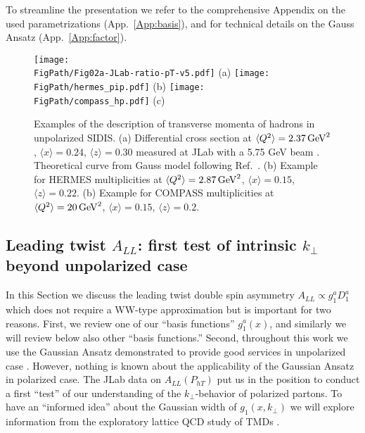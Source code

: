 \documentclass[a4paper,11pt]{article}
\newcommand{\la}{\langle}
\newcommand{\ra}{\rangle}
\def\Phperp{P_{hT}}
\def\kperp{k_\perp}
\newcommand*{\FigPath}{./figs}%
\begin{document}
To streamline the presentation we refer to the comprehensive Appendix 
on the used parametrizations (App.~\ref{App:basis}), and for 
technical details on the Gauss Ansatz (App.~\ref{App:factor}).

\begin{figure}[t!]
\centering
\texttt{[image: \\FigPath/Fig02a-JLab-ratio-pT-v5.pdf]}  (a)
\texttt{[image: \\FigPath/hermes\_pip.pdf]} (b)
\texttt{[image: \\FigPath/compass\_hp.pdf]} (c)
\caption{\label{FUU-show-pT-dependence}
Examples of the description of transverse momenta of hadrons in 
unpolarized SIDIS. 
(a) Differential cross section at $\la Q^2\ra=2.37\,{\rm GeV}^2$,
$\la x\ra  =0.24$, $\la z\ra  =0.30$ measured at JLab with a 5.75 GeV 
beam \cite{Osipenko:2008aa}. Theoretical curve from Gauss model 
following Ref.~\cite{Schweitzer:2010tt}.
(b) Example for HERMES multiplicities \cite{Airapetian:2012ki} at $\la Q^2\ra=2.87\,{\rm GeV}^2$,
$\la x\ra  =0.15$, $\la z\ra  =0.22$.
(b) Example for COMPASS multiplicities \cite{Aghasyan:2017ctw} at $\la Q^2\ra=20\,{\rm GeV}^2$,
$\la x\ra  =0.15$, $\la z\ra  =0.2$.}
\end{figure}



\subsection{\boldmath Leading twist $A_{LL}$: 
           first test of intrinsic $\kperp$ beyond unpolarized case}
\label{Sec-5.2:FLL-basis}

In this Section we discuss the leading twist double spin asymmetry 
$A_{LL} \propto g_{1}^a D_1^a$ which does not require a WW-type approximation
but is important for two reasons. First, we review one of our 
``basis functions'' $g_1^a(x)$, and similarly we will review below 
also other ``basis functions.'' Second, throughout this work we use the 
Gaussian Ansatz demonstrated to provide good services in unpolarized case 
\cite{Anselmino:2005nn,Collins:2005ie,D'Alesio:2007jt,Schweitzer:2010tt,
Signori:2013mda,Anselmino:2013lza}. However, nothing is known about
the applicability of the Gaussian Ansatz in polarized case.
The JLab data \cite{Avakian:2010ae} on $A_{LL}(\Phperp)$ put us 
in the position to conduct a first ``test'' of our understanding of 
the $\kperp$-behavior of polarized partons. To have an ``informed idea''
about the Gaussian width of $g_{1}(x,\kperp)$ we will explore information
from the exploratory lattice QCD study of TMDs \cite{Hagler:2009mb}.
\end{document}
